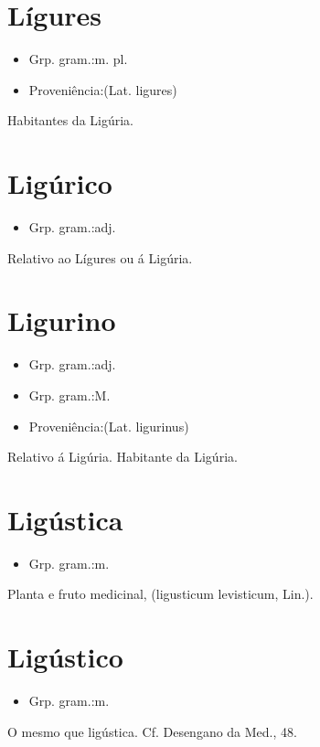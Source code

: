 \section{Lígures}
\begin{itemize}
\item {Grp. gram.:m. pl.}
\end{itemize}
\begin{itemize}
\item {Proveniência:(Lat. \textunderscore ligures\textunderscore )}
\end{itemize}
Habitantes da Ligúria.
\section{Ligúrico}
\begin{itemize}
\item {Grp. gram.:adj.}
\end{itemize}
Relativo ao Lígures ou á Ligúria.
\section{Ligurino}
\begin{itemize}
\item {Grp. gram.:adj.}
\end{itemize}
\begin{itemize}
\item {Grp. gram.:M.}
\end{itemize}
\begin{itemize}
\item {Proveniência:(Lat. \textunderscore ligurinus\textunderscore )}
\end{itemize}
Relativo á Ligúria.
Habitante da Ligúria.
\section{Ligústica}
\begin{itemize}
\item {Grp. gram.:m.}
\end{itemize}
Planta e fruto medicinal, (\textunderscore ligusticum levisticum\textunderscore , Lin.).
\section{Ligústico}
\begin{itemize}
\item {Grp. gram.:m.}
\end{itemize}
O mesmo que \textunderscore ligústica\textunderscore . Cf. \textunderscore Desengano da Med.\textunderscore , 48.
